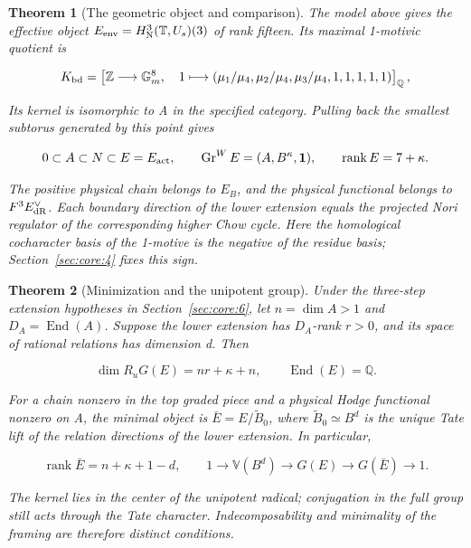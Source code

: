 \documentclass[11pt,a4paper,oneside]{article}
\theoremstyle{plain}
\newtheorem{theorem}{Theorem}[section]
\theoremstyle{definition}
\theoremstyle{remark}
\numberwithin{equation}{section}
\begin{document}
\begin{theorem}[The geometric object and comparison]

\label{thm:core:A} The model above gives the effective object \(E_{\rm env}=H^3_{\rm N}(\mathbb T,U_s)(3)\) of rank fifteen. Its maximal 1-motivic quotient is

\begin{equation}
K_{\rm bd}=\left[\mathbb Z\longrightarrow\mathbb G_m^8,\quad
 1\longmapsto(\mu_1/\mu_4,\mu_2/\mu_4,\mu_3/\mu_4,1,1,1,1,1)\right]_{\mathbb Q},
                                                               \label{eq:core:1.4}
\end{equation}

Its kernel is isomorphic to A in the specified category. Pulling back the smallest subtorus generated by this point gives

\begin{equation}
0\subset A\subset N\subset E=E_{\rm act},\qquad
 \operatorname{Gr}^W E=(A,B^\kappa,\mathbf1),\qquad
 \operatorname{rank}E=7+\kappa.                           \label{eq:core:1.5}
\end{equation}

The positive physical chain belongs to \(E_B\), and the physical functional belongs to \(F^3E_{\rm dR}^{\vee}\). Each boundary direction of the lower extension equals the projected Nori regulator of the corresponding higher Chow cycle. Here the homological cocharacter basis of the 1-motive is the negative of the residue basis; Section~\ref{sec:core:4} fixes this sign.

\end{theorem}

\begin{theorem}[Minimization and the unipotent group]

\label{thm:core:B} Under the three-step extension hypotheses in Section~\ref{sec:core:6}, let \(n=\dim A>1\) and \(D_A=\operatorname{End}(A)\). Suppose the lower extension has \(D_A\)-rank \(r>0\), and its space of rational relations has dimension d. Then

\begin{equation}
\dim R_uG(E)=nr+\kappa+n,\qquad
 \operatorname{End}(E)=\mathbb Q.                         \label{eq:core:1.6}
\end{equation}

For a chain nonzero in the top graded piece and a physical Hodge functional nonzero on A, the minimal object is \(\bar E=E/\widetilde B_0\), where \(\widetilde B_0\simeq B^d\) is the unique Tate lift of the relation directions of the lower extension. In particular,

\begin{equation}
\operatorname{rank}\bar E=n+\kappa+1-d,
 \qquad 1\longrightarrow\mathbb V(B^d)
 \longrightarrow G(E)\longrightarrow G(\bar E)\longrightarrow1. \label{eq:core:1.7}
\end{equation}

The kernel lies in the center of the unipotent radical; conjugation in the full group still acts through the Tate character. Indecomposability and minimality of the framing are therefore distinct conditions.

\end{theorem}
\end{document}
